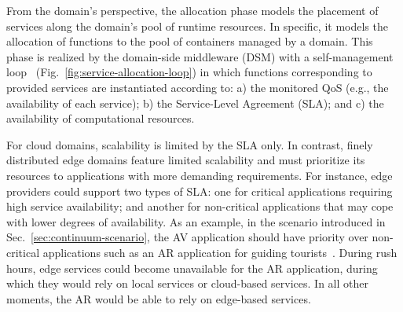 From the domain's perspective, the allocation phase models the placement of services along the domain's pool of runtime resources. In specific, it models the allocation of functions to the pool of containers managed by a domain. 
This phase is realized by the domain-side middleware (DSM) with a self-management loop~\cite{kephart2003vision} (Fig.~\ref{fig:service-allocation-loop}) in which functions corresponding to provided services are instantiated according to: a) the monitored QoS (e.g., the availability of each service); b) the Service-Level Agreement (SLA); and c) the availability of computational resources. 


For cloud domains, scalability is limited by the SLA only. In contrast, finely distributed edge domains feature limited scalability and must prioritize its resources to applications with more demanding requirements.
For instance, edge providers could support two types of SLA: one for critical applications requiring high service availability; and another for non-critical applications that may cope with lower degrees of availability. 
As an example, in the scenario introduced in Sec.~\ref{sec:continuum-scenario}, the AV application should have priority over non-critical applications such as an AR application for guiding tourists~\cite{GarrigaMendonca2017}. During rush hours, edge services could become unavailable for the AR application, during which they would rely on local services or cloud-based services. In all other moments, the AR would be able to rely on edge-based services. 

